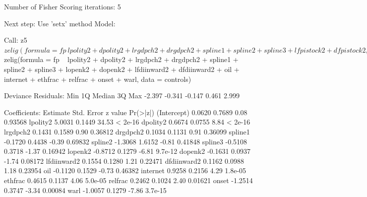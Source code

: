 \documentclass[12pt,a4paper]{article}
\begin{document}
{Number of Fisher Scoring iterations: 5

Next step: Use 'setx' method
Model: 

Call:
z5$zelig(formula = fp ~ lpolity2 + dpolity2 + lrgdpch2 + drgdpch2 + 
    spline1 + spline2 + spline3 + lfpistock2 + dfpistock2, data = model4vars)

Deviance Residuals: 
   Min      1Q  Median      3Q     Max  
-2.388  -0.209   0.344   0.436   3.028  

Coefficients:
            Estimate Std. Error z value Pr(>|z|)
(Intercept) -1.61804    0.62591   -2.59  0.00974
lpolity2     5.43658    0.22826   23.82  < 2e-16
dpolity2     0.67687    0.12034    5.62  1.9e-08
lrgdpch2    -0.05704    0.20159   -0.28  0.77723
drgdpch2    -0.22396    0.20285   -1.10  0.26955
spline1     -0.00885    0.40234   -0.02  0.98246
spline2      2.19913    1.34341    1.64  0.10164
spline3      0.96867    0.26375    3.67  0.00024
lfpistock2   0.33163    0.19523    1.70  0.08937
dfpistock2   0.27881    0.12771    2.18  0.02903

(Dispersion parameter for binomial family taken to be 1)

    Null deviance: 3446.4  on 2721  degrees of freedom
Residual deviance: 1665.6  on 2712  degrees of freedom
AIC: 1686

Number of Fisher Scoring iterations: 5

Next step: Use 'setx' method
Model: 

Call:
z5$zelig(formula = fp ~ lpolity2 + dpolity2 + lrgdpch2 + drgdpch2 + 
    spline1 + spline2 + spline3 + lopenk2 + dopenk2 + lfdiinward2 + 
    dfdiinward2 + oil + internet + ethfrac + relfrac + onset + 
    warl, data = controls)

Deviance Residuals: 
   Min      1Q  Median      3Q     Max  
-2.397  -0.341  -0.147   0.461   2.999  

Coefficients:
            Estimate Std. Error z value Pr(>|z|)
(Intercept)   0.0620     0.7689    0.08  0.93568
lpolity2      5.0031     0.1449   34.53  < 2e-16
dpolity2      0.6674     0.0755    8.84  < 2e-16
lrgdpch2      0.1431     0.1589    0.90  0.36812
drgdpch2      0.1034     0.1131    0.91  0.36099
spline1      -0.1720     0.4438   -0.39  0.69832
spline2      -1.3068     1.6152   -0.81  0.41848
spline3      -0.5108     0.3718   -1.37  0.16942
lopenk2      -0.8712     0.1279   -6.81  9.7e-12
dopenk2      -0.1631     0.0937   -1.74  0.08172
lfdiinward2   0.1554     0.1280    1.21  0.22471
dfdiinward2   0.1162     0.0988    1.18  0.23954
oil          -0.1120     0.1529   -0.73  0.46382
internet      0.9258     0.2156    4.29  1.8e-05
ethfrac       0.4615     0.1137    4.06  5.0e-05
relfrac       0.2462     0.1024    2.40  0.01621
onset        -1.2514     0.3747   -3.34  0.00084
warl         -1.0057     0.1279   -7.86  3.7e-15

}
\end{document}
